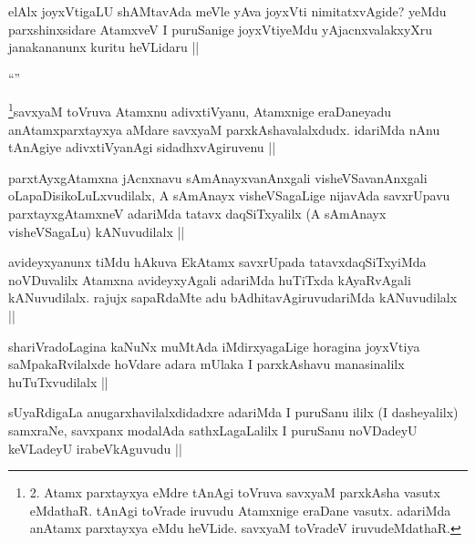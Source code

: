 \begin{artha}
elAlx joyxVtigaLU shAMtavAda meVle yAva joyxVti nimitatxvAgide? yeMdu parxshinxsidare AtamxveV I puruSanige joyxVtiyeMdu yAjacnxvalakxyXru janakananunx kuritu heVLidaru ||
\end{artha}

\begin{artha}
``\stext''
\end{artha}

\begin{artha}
\footnote[1]{2. Atamx parxtayxya eMdre tAnAgi toVruva savxyaM parxkAsha vasutx eMdathaR. tAnAgi toVrade iruvudu Atamxnige eraDane vasutx. adariMda anAtamx parxtayxya eMdu heVLide. savxyaM toVradeV iruvudeMdathaR.}savxyaM toVruva Atamxnu adivxtiVyanu, Atamxnige eraDaneyadu \footnotemark[2]anAtamxparxtayxya aMdare savxyaM parxkAshavalalxdudx. idariMda nAnu tAnAgiye adivxtiVyanAgi sidadhxvAgiruvenu ||
\end{artha}

\begin{artha}
parxtAyxgAtamxna jAcnxnavu sAmAnayxvanAnxgali visheVSavanAnxgali oLapaDisikoLuLxvudilalx, A sAmAnayx visheVSagaLige nijavAda savxrUpavu parxtayxgAtamxneV adariMda tatavx daqSiTxyalilx (A sAmAnayx visheVSagaLu) kANuvudilalx ||
\end{artha}

\begin{artha}
avideyxyanunx tiMdu hAkuva EkAtamx savxrUpada tatavxdaqSiTxyiMda noVDuvalilx Atamxna avideyxyAgali adariMda huTiTxda kAyaRvAgali kANuvudilalx. rajujx sapaRdaMte adu bAdhitavAgiruvudariMda kANuvudilalx ||
\end{artha}

\begin{artha}
shariVradoLagina kaNuNx muMtAda iMdirxyagaLige horagina joyxVtiya saMpakaRvilalxde hoVdare adara mUlaka I parxkAshavu manasinalilx huTuTxvudilalx ||
\end{artha}

\begin{artha}
sUyaRdigaLa anugarxhavilalxdidadxre adariMda I puruSanu ililx (I dasheyalilx) samxraNe, savxpanx modalAda sathxLagaLalilx I puruSanu noVDadeyU keVLadeyU irabeVkAguvudu ||
\end{artha}

